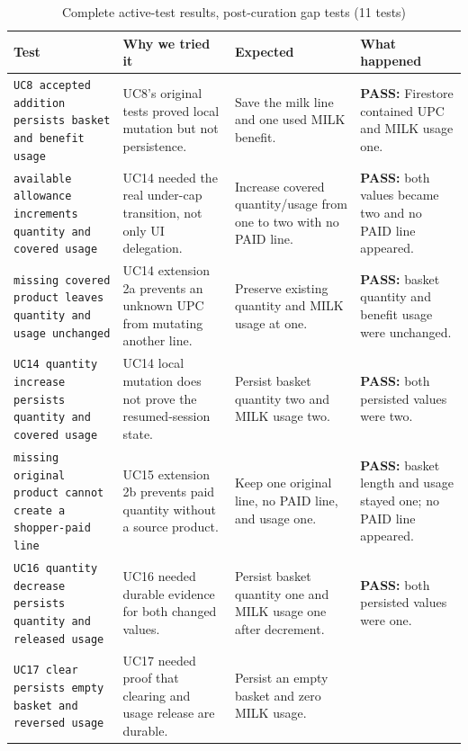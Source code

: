\documentclass[sigconf]{acmart}
\begin{document}
\begin{table}[!p]
  \caption{Complete active-test results, post-curation gap tests (11 tests)}
  \label{tab:complete-results-6}
  \centering
  \tiny
  \setlength{\tabcolsep}{2pt}
  \renewcommand{\arraystretch}{1.12}
  \begin{tabular}{@{}L{0.26\textwidth}L{0.21\textwidth}L{0.20\textwidth}L{0.27\textwidth}@{}}
    \toprule
    Test & Why we tried it & Expected & What happened \\
    \midrule
    \texttt{UC8 accepted addition persists basket and benefit usage}
      & UC8's original tests proved local mutation but not persistence.
      & Save the milk line and one used MILK benefit.
      & \textbf{PASS:} Firestore contained UPC  and MILK usage one. \\
    \texttt{available allowance increments quantity and covered usage}
      & UC14 needed the real under-cap transition, not only UI delegation.
      & Increase covered quantity/usage from one to two with no PAID line.
      & \textbf{PASS:} both values became two and no PAID line appeared. \\
    \texttt{missing covered product leaves quantity and usage unchanged}
      & UC14 extension 2a prevents an unknown UPC from mutating another line.
      & Preserve existing quantity and MILK usage at one.
      & \textbf{PASS:} basket quantity and benefit usage were unchanged. \\
    \texttt{UC14 quantity increase persists quantity and covered usage}
      & UC14 local mutation does not prove the resumed-session state.
      & Persist basket quantity two and MILK usage two.
      & \textbf{PASS:} both persisted values were two. \\
    \texttt{missing original product cannot create a shopper-paid line}
      & UC15 extension 2b prevents paid quantity without a source product.
      & Keep one original line, no PAID line, and usage one.
      & \textbf{PASS:} basket length and usage stayed one; no PAID line appeared. \\
    \texttt{UC16 quantity decrease persists quantity and released usage}
      & UC16 needed durable evidence for both changed values.
      & Persist basket quantity one and MILK usage one after decrement.
      & \textbf{PASS:} both persisted values were one. \\
    \texttt{UC17 clear persists empty basket and reversed usage}
      & UC17 needed proof that clearing and usage release are durable.
      & Persist an empty basket and zero MILK usage.

\end{tabular}
\end{table}
\end{document}
